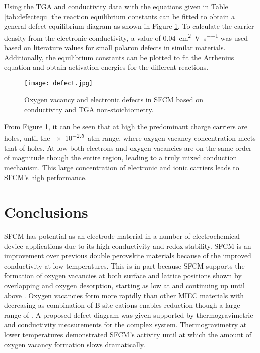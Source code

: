     Using the TGA and conductivity data with the equations given in Table \ref{tab:defectequ} the reaction equilibrium constants can be fitted to obtain a general defect equilibrium diagram as shown in Figure \ref{fig:defects}.
    To calculate the carrier density from the electronic conductivity, a value of \SI{0.04}{\centi\meter\squared\per\volt\per\second} was used based on literature values for small polaron defects in similar materials.\cite{Marrero-lopez2010}
    Additionally, the equilibrium constants can be plotted to fit the Arrhenius equation and obtain activation energies for the different reactions.

    \begin{figure}
      \texttt{[image: defect.jpg]}
      \caption{Oxygen vacancy and electronic defects in SFCM based on conductivity and TGA non-stoichiometry.}
      \label{fig:defects}
    \end{figure}

    From Figure \ref{fig:defects}, it can be seen that at high  the predominant charge carriers are holes, until the \SI{e-2.5}{atm} range, where oxygen vacancy concentration meets that of holes.
    At low  both electrons and oxygen vacancies are on the same order of magnitude though the entire region, leading to a truly mixed conduction mechanism.
    This large concentration of electronic and ionic carriers leads to SFCM's high performance.%


\section{Conclusions}
    SFCM has potential as an electrode material in a number of electrochemical device applications due to its high conductivity and redox stability.
    SFCM is an improvement over previous double perovskite materials because of the improved conductivity at low temperatures.
    This is in part because SFCM supports the formation of oxygen vacancies at both surface and lattice positions shown by overlapping \textalpha{} and \textbeta{} oxygen desorption, starting as low at  and continuing up until above .
    Oxygen vacancies form more rapidly than other MIEC materials with decreasing  as combination of B-site cations enables reduction though a large range of .
    A proposed defect diagram was given supported by thermogravimetric and conductivity measurements for the complex system.
    Thermogravimetry at lower temperatures demonstrated SFCM's activity until  at which the amount of oxygen vacancy formation slows dramatically.
